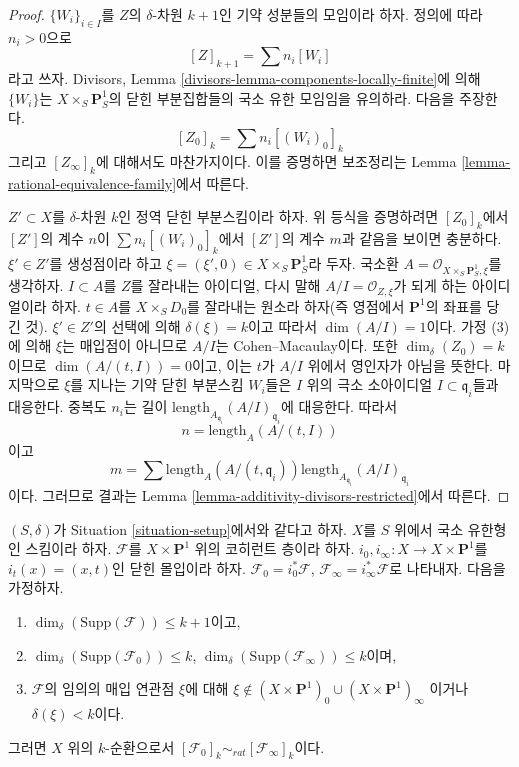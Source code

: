 \begin{proof}
$\{W_i\}_{i \in I}$를 $Z$의 $\delta$-차원 $k + 1$인 기약 성분들의
모임이라 하자. 정의에 따라 $n_i > 0$으로
$$
[Z]_{k + 1} = \sum n_i[W_i]
$$
라고 쓰자. Divisors, Lemma
\ref{divisors-lemma-components-locally-finite}에 의해 $\{W_i\}$는
$X \times_S \mathbf{P}^1_S$의 닫힌 부분집합들의 국소 유한 모임임을
유의하라. 다음을 주장한다.
$$
[Z_0]_k = \sum n_i[(W_i)_0]_k
$$
그리고 $[Z_\infty]_k$에 대해서도 마찬가지이다. 이를 증명하면 보조정리는
Lemma \ref{lemma-rational-equivalence-family}에서 따른다.

\medskip\noindent
$Z' \subset X$를 $\delta$-차원 $k$인 정역 닫힌 부분스킴이라 하자.
위 등식을 증명하려면 $[Z_0]_k$에서 $[Z']$의 계수 $n$이
$\sum n_i[(W_i)_0]_k$에서 $[Z']$의 계수 $m$과 같음을 보이면 충분하다.
$\xi' \in Z'$를 생성점이라 하고
$\xi = (\xi', 0) \in  X \times_S \mathbf{P}^1_S$라 두자. 국소환
$A = \mathcal{O}_{X \times_S \mathbf{P}^1_S, \xi}$를 생각하자.
$I \subset A$를 $Z$를 잘라내는 아이디얼, 다시 말해
$A/I = \mathcal{O}_{Z, \xi}$가 되게 하는 아이디얼이라 하자.
$t \in A$를 $X \times_S D_0$를 잘라내는 원소라 하자(즉 영점에서
$\mathbf{P}^1$의 좌표를 당긴 것). $\xi' \in Z'$의 선택에 의해
$\delta(\xi) = k$이고 따라서 $\dim(A/I) = 1$이다. 가정 (3)에 의해
$\xi$는 매입점이 아니므로 $A/I$는 Cohen--Macaulay이다. 또한
$\dim_\delta(Z_0)
= k$이므로 $\dim(A/(t, I)) = 0$이고, 이는 $t$가 $A/I$ 위에서
영인자가 아님을 뜻한다. 마지막으로 $\xi$를 지나는 기약 닫힌 부분스킴
$W_i$들은 $I$ 위의 극소 소아이디얼 $I \subset \mathfrak q_i$들과
대응한다. 중복도 $n_i$는 길이
$\text{length}_{A_{\mathfrak q_i}}(A/I)_{\mathfrak q_i}$에 대응한다.
따라서
$$
n = \text{length}_A(A/(t, I))
$$
이고
$$
m = \sum
\text{length}_A(A/(t, \mathfrak q_i))
\text{length}_{A_{\mathfrak q_i}}(A/I)_{\mathfrak q_i}
$$
이다. 그러므로 결과는 Lemma
\ref{lemma-additivity-divisors-restricted}에서 따른다.
\end{proof}

\begin{lemma}
\label{lemma-coherent-sheaf-cross-p1}
$(S, \delta)$가 Situation \ref{situation-setup}에서와 같다고 하자.
$X$를 $S$ 위에서 국소 유한형인 스킴이라 하자. $\mathcal{F}$를
$X \times \mathbf{P}^1$ 위의 코히런트 층이라 하자.
$i_0, i_\infty : X \to X \times \mathbf{P}^1$를
$i_t(x) = (x, t)$인 닫힌 몰입이라 하자.
$\mathcal{F}_0 = i_0^*\mathcal{F}$,
$\mathcal{F}_\infty = i_\infty^*\mathcal{F}$로 나타내자. 다음을
가정하자.
\begin{enumerate}
\item $\dim_\delta(\text{Supp}(\mathcal{F})) \leq k + 1$이고,
\item $\dim_\delta(\text{Supp}(\mathcal{F}_0)) \leq k$,
$\dim_\delta(\text{Supp}(\mathcal{F}_\infty)) \leq k$이며,
\item $\mathcal{F}$의 임의의 매입 연관점 $\xi$에 대해
$\xi \not \in (X \times \mathbf{P}^1)_0 \cup (X \times \mathbf{P}^1)_\infty$
이거나 $\delta(\xi) < k$이다.
\end{enumerate}
그러면 $X$ 위의 $k$-순환으로서
$[\mathcal{F}_0]_k \sim_{rat} [\mathcal{F}_\infty]_k$이다.
\end{lemma}

